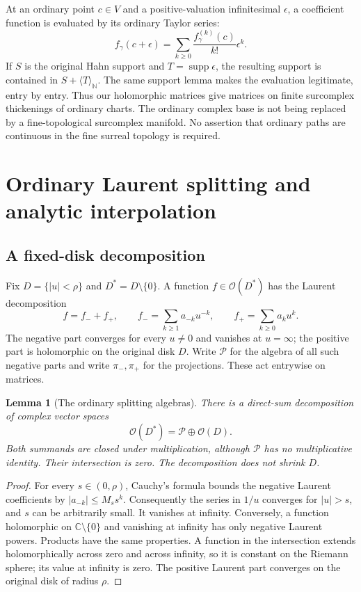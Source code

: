 \documentclass[11pt,letterpaper]{article}
\newtheorem{lemma}[lemma]{Lemma}
\theoremstyle{definition}
\theoremstyle{remark}
\newcommand{\C}{\mathbb C}
\newcommand{\N}{\mathbb N}
\newcommand{\OO}{\mathcal O}
\newcommand{\supp}{\operatorname{supp}}
\newcommand{\PP}{\mathcal P}
\newcommand{\angles}[1]{\langle #1\rangle_{\N}}
\numberwithin{equation}{section}
\begin{document}
At an ordinary point $c\in V$ and a positive-valuation infinitesimal $\epsilon$, a coefficient function is evaluated by its ordinary Taylor series:
\[
 f_\gamma(c+\epsilon)
 =\sum_{k\geq0}\frac{f_\gamma^{(k)}(c)}{k!}\epsilon^k.
\]
If $S$ is the original Hahn support and $T=\supp\epsilon$, the resulting support is contained in $S+\angles T$. The same support lemma makes the evaluation legitimate, entry by entry. Thus our holomorphic matrices give matrices on finite surcomplex thickenings of ordinary charts. The ordinary complex base is not being replaced by a fine-topological surcomplex manifold. No assertion that ordinary paths are continuous in the fine surreal topology is required.

\section{Ordinary Laurent splitting and analytic interpolation}\label{sec:ordinary}

\subsection{A fixed-disk decomposition}

Fix $D=\{|u|<\rho\}$ and $D^*=D\setminus\{0\}$. A function $f\in\OO(D^*)$ has the Laurent decomposition
\begin{equation}\label{eq:Laurent}
 f=f_-+f_+,
 \qquad
 f_- =\sum_{k\geq1}a_{-k}u^{-k},
 \qquad
 f_+ =\sum_{k\geq0}a_ku^k.
\end{equation}
The negative part converges for every $u\ne0$ and vanishes at $u=\infty$; the positive part is holomorphic on the original disk $D$. Write $\PP$ for the algebra of all such negative parts and write $\pi_-,\pi_+$ for the projections. These act entrywise on matrices.

\begin{lemma}[The ordinary splitting algebras]\label{lem:Laurent}
There is a direct-sum decomposition of complex vector spaces
\[
 \OO(D^*)=\PP\oplus\OO(D).
\]
Both summands are closed under multiplication, although $\PP$ has no multiplicative identity. Their intersection is zero. The decomposition does not shrink $D$.
\end{lemma}

\begin{proof}
For every $s\in(0,\rho)$, Cauchy's formula bounds the negative Laurent coefficients by $|a_{-k}|\leq M_s s^k$. Consequently the series in $1/u$ converges for $|u|>s$, and $s$ can be arbitrarily small. It vanishes at infinity. Conversely, a function holomorphic on $\C\setminus\{0\}$ and vanishing at infinity has only negative Laurent powers. Products have the same properties. A function in the intersection extends holomorphically across zero and across infinity, so it is constant on the Riemann sphere; its value at infinity is zero. The positive Laurent part converges on the original disk of radius $\rho$.
\end{proof}
\end{document}
